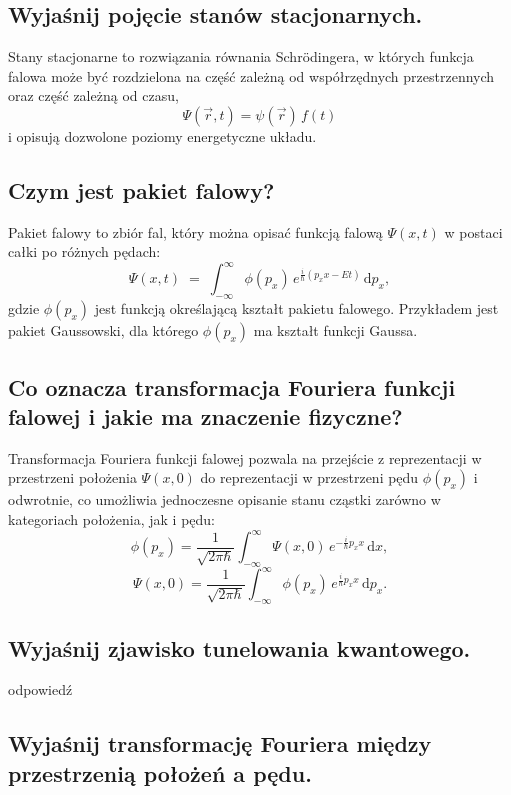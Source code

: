 \subsection{Wyjaśnij pojęcie stanów stacjonarnych.}

Stany stacjonarne to rozwiązania równania Schrödingera, w których funkcja falowa może być rozdzielona na część zależną od współrzędnych przestrzennych oraz część zależną od czasu,
\[
\Psi(\vec r, t) = \psi(\vec r)\,f(t)
\]
i opisują dozwolone poziomy energetyczne układu.

\subsection{Czym jest pakiet falowy?}

Pakiet falowy to zbiór fal, który można opisać funkcją falową \(\Psi(x,t)\) w postaci całki po różnych pędach:
\[
\Psi(x,t)\;=\;\int_{-\infty}^{\infty}\!\phi(p_x)\,e^{\tfrac{i}{\hbar}(p_x x - E t)}\,\mathrm{d}p_x,
\]
gdzie \(\phi(p_x)\) jest funkcją określającą kształt pakietu falowego.  
Przykładem jest pakiet Gaussowski, dla którego \(\phi(p_x)\) ma kształt funkcji Gaussa.

\subsection{Co oznacza transformacja Fouriera funkcji falowej i jakie ma znaczenie fizyczne?}

Transformacja Fouriera funkcji falowej pozwala na przejście z reprezentacji w przestrzeni położenia \(\Psi(x,0)\) do reprezentacji w przestrzeni pędu \(\phi(p_x)\) i odwrotnie, co umożliwia jednoczesne opisanie stanu cząstki zarówno w kategoriach położenia, jak i pędu:
\[
\phi(p_x)
=\frac{1}{\sqrt{2\pi\hbar}}
\int_{-\infty}^{\infty}
\Psi(x,0)\,e^{-\frac{i}{\hbar}p_x x}\,\mathrm{d}x,
\]
\[
\Psi(x,0)
=\frac{1}{\sqrt{2\pi\hbar}}
\int_{-\infty}^{\infty}
\phi(p_x)\,e^{\frac{i}{\hbar}p_x x}\,\mathrm{d}p_x.
\]

\subsection{Wyjaśnij zjawisko tunelowania kwantowego.}

odpowiedź

\subsection{Wyjaśnij transformację Fouriera między przestrzenią położeń a pędu.}

